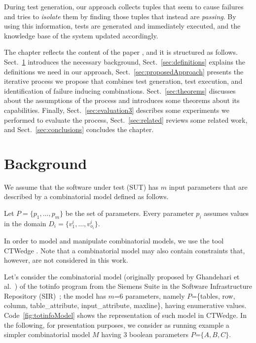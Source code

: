 \begin{tikzborder}{\cite{Gargantini16:validation}}
\begin{tikzborder}{\cite{gargantini_combinatorial_2017}}
\begin{tikzborder}{\cite{garn2019}}
\begin{tikzborder}{\cite{arcaini2019achieving}}
During test generation, our approach collects tuples that seem to cause failures and tries to \emph{isolate} them by finding those tuples that instead are \emph{passing}. By using this information, tests are generated and immediately executed, and the knowledge base of the system updated accordingly.

The chapter reflects the content of the paper \cite{iwct19}, and it is structured as follows. Sect.~\ref{sec:background} introduces the necessary background, Sect.~\ref{sec:definitions} explains the definitions we need in our approach, Sect.~\ref{sec:proposedApproach} presents the iterative process we propose that combines test generation, test execution, and identification of failure inducing combinations. Sect.~\ref{sec:theorems} discusses about the assumptions of the process and introduces some theorems about its capabilities. Finally, Sect.~\ref{sec:evaluation3} describes some experiments we performed to evaluate the process, Sect.~\ref{sec:related} reviews some related work, and Sect.~\ref{sec:conclusions} concludes the chapter.

\section{Background}\label{sec:background}

\begin{tikzborder}{\cite{iwct19}}
We assume that the software under test (SUT) has $m$ input parameters that are described by a combinatorial model defined as follows.

\begin{defn}\label{def:combModel}
	Let $P = \{p_1, \dots , p_m\}$ be the set of parameters. Every parameter $p_i$ assumes values in the domain $D_i = \{v^i_1, \dots , v^i_{o_i}\}$.
\end{defn}

In order to model and manipulate combinatorial models, we use the tool CTWedge \cite{IWCTGargantini2018}. Note that a combinatorial model may also contain constraints that, however, are not considered in this work.

\begin{example}\label{ex:model}
	Let's consider the combinatorial model (originally proposed by Ghandehari et al.~\cite{ghandehari_applying_2013}) of the \textsf{totinfo} program from the Siemens Suite in the Software Infrastructure Repository (SIR)~\cite{doESE05}; the model has $m$=6 parameters, namely $P$=\{tables, row, column, table\_attribute, input\_attribute, maxline\}, having enumerative values. Code~\ref{fig:totinfoModel} shows the representation of such model in CTWedge. In the following, for presentation purposes, we consider as running example a simpler combinatorial model $M$ having 3 boolean parameters $P$=$\{A, B, C\}$.
\end{example}
\end{tikzborder}


\end{tikzborder}
\end{tikzborder}
\end{tikzborder}
\end{tikzborder}
